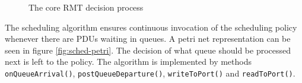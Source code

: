             \begin{figure}[H]
                \begin{center}
                  \caption{The core RMT decision process}
                  \label{fig:rmt-fsm}
                \end{center}
            \end{figure}

            The scheduling algorithm ensures continuous invocation of the scheduling policy whenever there are PDUs waiting in queues. A petri net representation can be seen in figure \ref{fig:sched-petri}. The decision of what queue should be processed next is left to the policy. The algorithm is implemented by methods \texttt{onQueueArrival()}, \texttt{postQueueDeparture()}, \texttt{writeToPort()} and \texttt{readToPort()}.

